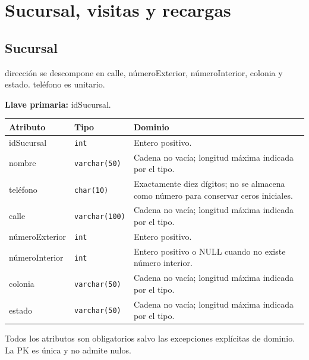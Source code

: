 \section{Sucursal, visitas y recargas}
\par\noindent\begin{minipage}{\textwidth}
\subsection{Sucursal}
dirección se descompone en calle, númeroExterior, númeroInterior, colonia y estado. teléfono es unitario.\par
\textbf{Llave primaria:} idSucursal.\par
{\small\begin{tabular}{@{}p{}p{}p{}@{}}
\toprule Atributo & Tipo & Dominio \\ \midrule
idSucursal & \texttt{int} & Entero positivo. \\
nombre & \texttt{varchar(50)} & Cadena no vacía; longitud máxima indicada por el tipo. \\
teléfono & \texttt{char(10)} & Exactamente diez dígitos; no se almacena como número para conservar ceros iniciales. \\
calle & \texttt{varchar(100)} & Cadena no vacía; longitud máxima indicada por el tipo. \\
númeroExterior & \texttt{int} & Entero positivo. \\
númeroInterior & \texttt{int} & Entero positivo o NULL cuando no existe número interior. \\
colonia & \texttt{varchar(50)} & Cadena no vacía; longitud máxima indicada por el tipo. \\
estado & \texttt{varchar(50)} & Cadena no vacía; longitud máxima indicada por el tipo. \\
\bottomrule\end{tabular}}
Todos los atributos son obligatorios salvo las excepciones explícitas de dominio. La PK es única y no admite nulos.
\end{minipage}\par\vspace{.35cm}
